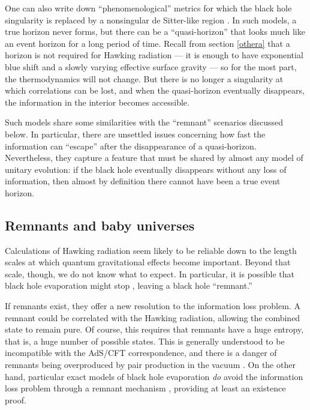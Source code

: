 \documentclass[12pt]{article}
\begin{document}
One can also write down ``phenomenological'' metrics for
which the black hole singularity is replaced by a nonsingular
de Sitter-like region \cite{FrolovVil,Hayward,Frolov,Bardeen}.
In such models, a true horizon never forms, but there can be a
``quasi-horizon'' that looks much like an event horizon for 
a long period of time.  Recall from section \ref{othera} that
a horizon is not required for Hawking radiation --- it is 
enough to have exponential blue shift and a slowly varying 
effective surface gravity --- so for the most part, the
thermodynamics will not change.  But there is no longer
a singularity at which correlations can be lost, and when
the quasi-horizon eventually disappears, the information
in the interior becomes accessible.

Such models share some similarities with the ``remnant''
scenarios discussed below.  In particular, there are unsettled
issues concerning how fast the information can ``escape'' 
after the disappearance of a quasi-horizon.  Nevertheless,
they capture a feature that must be shared by almost any
model of unitary evolution: if the black hole eventually
disappears without any loss of information, then almost by
definition there cannot have been a true event horizon.

\subsection{Remnants and baby universes}

Calculations of Hawking radiation seem likely to be reliable
down to the length scales at which quantum gravitational effects 
become important.  Beyond that scale, though, we do not know 
what to expect.  In particular, it is possible that black hole 
evaporation might stop \cite{Aharanov}, leaving a black hole 
``remnant.'' 
  
If remnants exist, they offer a new resolution to the
information loss problem.  A remnant could be
correlated with the  Hawking radiation, allowing
the combined state to remain pure.  Of course, this requires
that remnants have a huge entropy, that is, a huge number of 
possible states.  This is generally understood to be incompatible
with the AdS/CFT correspondence, and there is a danger of
remnants being overproduced by pair production in the vacuum
\cite{Giddingsx}.  On the other hand, particular exact models 
of black hole evaporation \emph{do} avoid the information
loss problem through a remnant mechanism \cite{Almheiri},
providing at least an existence proof.
\end{document}
